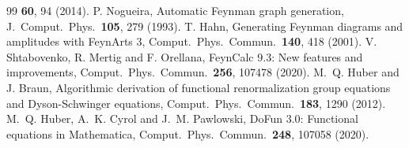 \documentclass[11pt,a4paper]{article}
\begin{document}
\begin{thebibliography}{99}
  \textbf{60}, 94 (2014).
 P. Nogueira, Automatic Feynman graph generation, J.\ Comput.\ Phys.\ \textbf{105}, 279 (1993).
 T. Hahn, Generating Feynman diagrams and amplitudes with FeynArts 3, Comput.\ Phys.\ Commun.\ \textbf{140}, 418 (2001).
 V. Shtabovenko, R. Mertig and F. Orellana, FeynCalc 9.3: New features and improvements, Comput.\ Phys.\ Commun.\ \textbf{256}, 107478 (2020).
 M.~Q. Huber and J. Braun, Algorithmic derivation of functional renormalization group equations and Dyson-Schwinger equations, Comput.\ Phys.\ Commun.\ \textbf{183}, 1290 (2012).
 M.~Q. Huber, A.~K. Cyrol and J.~M. Pawlowski, DoFun 3.0: Functional equations in Mathematica, Comput.\ Phys.\ Commun.\ \textbf{248}, 107058 (2020).
\end{thebibliography}
\endgroup
\end{document}
